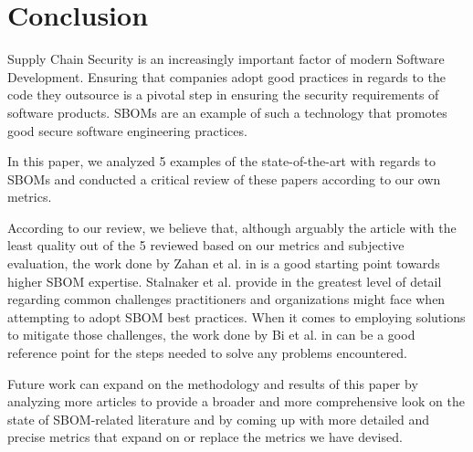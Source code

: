 \section{Conclusion}

Supply Chain Security is an increasingly important factor of modern Software Development. Ensuring that companies adopt good practices in regards to the code they outsource is a pivotal step in ensuring the security requirements of software products. SBOMs \cite{article:concept:sbom-2} are an example of such a technology that promotes good secure software engineering practices.

\noindent In this paper, we analyzed 5 examples of the state-of-the-art with regards to SBOMs and conducted a critical review of these papers according to our own metrics.

\noindent According to our review, we believe that, although arguably the article with the least quality out of the 5 reviewed based on our metrics and subjective evaluation, the work done by Zahan et al. in \cite{article:sbom-required} is a good starting point towards higher SBOM expertise. Stalnaker et al. provide in \cite{article:software-bom} the greatest level of detail regarding common challenges practitioners and organizations might face when attempting to adopt SBOM best practices. When it comes to employing solutions to mitigate those challenges, the work done by Bi et al. in \cite{article:sboms-issues-solutions} can be a good reference point for the steps needed to solve any problems encountered.

\noindent Future work can expand on the methodology and results of this paper by analyzing more articles to provide a broader and more comprehensive look on the state of SBOM-related literature and by coming up with more detailed and precise metrics that expand on or replace the metrics we have devised.